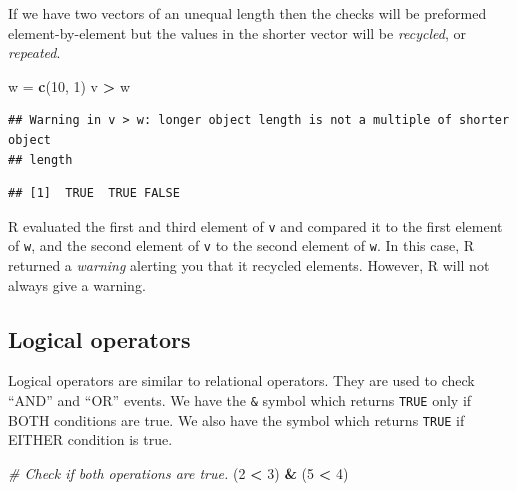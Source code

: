 \documentclass[
]{book}
\newenvironment{Shaded}{\begin{snugshade}}{\end{snugshade}}
\newcommand{\CommentTok}[1]{\textcolor[rgb]{0.56,0.35,0.01}{\textit{#1}}}
\newcommand{\DecValTok}[1]{\textcolor[rgb]{0.00,0.00,0.81}{#1}}
\newcommand{\KeywordTok}[1]{\textcolor[rgb]{0.13,0.29,0.53}{\textbf{#1}}}
\newcommand{\NormalTok}[1]{#1}
\newcommand{\OperatorTok}[1]{\textcolor[rgb]{0.81,0.36,0.00}{\textbf{#1}}}
\newcommand{\StringTok}[1]{\textcolor[rgb]{0.31,0.60,0.02}{#1}}
\begin{document}
If we have two vectors of an unequal length then the checks will be preformed element-by-element but the values in the shorter vector will be \emph{recycled}, or \emph{repeated}.

\begin{Shaded}
\begin{Highlighting}[]
\NormalTok{w =}\StringTok{ }\KeywordTok{c}\NormalTok{(}\DecValTok{10}\NormalTok{, }\DecValTok{1}\NormalTok{)}
\NormalTok{v }\OperatorTok{>}\StringTok{ }\NormalTok{w}
\end{Highlighting}
\end{Shaded}

\begin{verbatim}
## Warning in v > w: longer object length is not a multiple of shorter object
## length
\end{verbatim}

\begin{verbatim}
## [1]  TRUE  TRUE FALSE
\end{verbatim}

R evaluated the first and third element of \texttt{v} and compared it to the first element of \texttt{w}, and the second element of \texttt{v} to the second element of \texttt{w}. In this case, R returned a \emph{warning} alerting you that it recycled elements. However, R will not always give a warning.

\hypertarget{logical-operators}{%
\subsection*{Logical operators}\label{logical-operators}}

Logical operators are similar to relational operators. They are used to check ``AND'' and ``OR'' events. We have the \texttt{\&} symbol which returns \texttt{TRUE} only if BOTH conditions are true. We also have the \texttt{\textbar{}} symbol which returns \texttt{TRUE} if EITHER condition is true.

\begin{Shaded}
\begin{Highlighting}[]
\CommentTok{# Check if both operations are true. }
\NormalTok{(}\DecValTok{2} \OperatorTok{<}\StringTok{ }\DecValTok{3}\NormalTok{) }\OperatorTok{&}\StringTok{ }\NormalTok{(}\DecValTok{5} \OperatorTok{<}\StringTok{ }\DecValTok{4}\NormalTok{)}
\end{Highlighting}
\end{Shaded}
\end{document}
